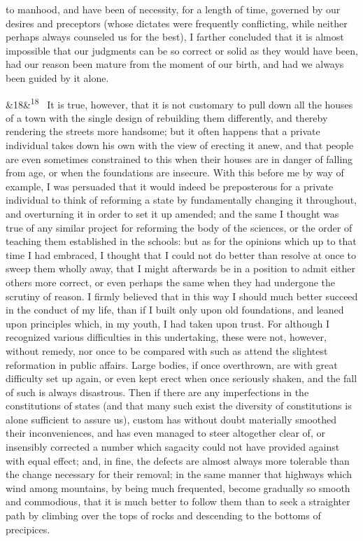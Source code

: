 \documentclass[12pt]{article}
\newcommand{\para}[1][]{\par\noindent\ifx&#1&\else\textsuperscript{\footnotesize #1}~\fi}
\begin{document}
to manhood, and have been of necessity, for a length of time, governed by our desires and preceptors (whose dictates were frequently conflicting, while neither perhaps always counseled us for the best), I farther concluded that it is almost impossible that our judgments can be so correct or solid as they would have been, had our reason been mature from the moment of our birth, and had we always been guided by it alone.

\para[18] It is true, however, that it is not customary to pull down all the houses of a town with the single design of rebuilding them differently, and thereby rendering the streets more handsome; but it often happens that a private individual takes down his own with the view of erecting it anew, and that people are even sometimes constrained to this when their houses are in danger of falling from age, or when the foundations are insecure. With this before me by way of example, I was persuaded that it would indeed be preposterous for a private individual to think of reforming a state by fundamentally changing it throughout, and overturning it in order to set it up amended; and the same I thought was true of any similar project for reforming the body of the sciences, or the order of teaching them established in the schools: but as for the opinions which up to that time I had embraced, I thought that I could not do better than resolve at once to sweep them wholly away, that I might afterwards be in a position to admit either others more correct, or even perhaps the same when they had undergone the scrutiny of reason. I firmly believed that in this way I should much better succeed in the conduct of my life, than if I built only upon old foundations, and leaned upon principles which, in my youth, I had taken upon trust. For although I recognized various difficulties in this undertaking, these were not, however, without remedy, nor once to be compared with such as attend the slightest reformation in public affairs. Large bodies, if once overthrown, are with great difficulty set up again, or even kept erect when once seriously shaken, and the fall of such is always disastrous. Then if there are any imperfections in the constitutions of states (and that many such exist the diversity of constitutions is alone sufficient to assure us), custom has without doubt materially smoothed their inconveniences, and has even managed to steer altogether clear of, or insensibly corrected a number which sagacity could not have provided against with equal effect; and, in fine, the defects are almost always more tolerable than the change necessary for their removal; in the same manner that highways which wind among mountains, by being much frequented, become gradually so smooth and commodious, that it is much better to follow them than to seek a straighter path by climbing over the tops of rocks and descending to the bottoms of precipices.
\end{document}
